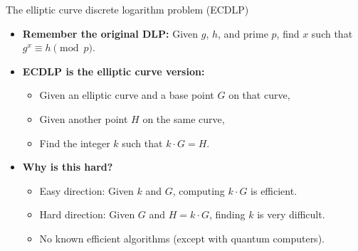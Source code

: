 \documentclass[aspectratio=169, lualatex, handout]{beamer}
\begin{document}
\begin{frame}{The elliptic curve discrete logarithm problem (ECDLP)}
	\begin{itemize}[<+->]
		\item \textbf{Remember the original DLP:} Given $g$, $h$, and prime $p$, find $x$ such that $g^x \equiv h \pmod{p}$.
		\item \textbf{ECDLP is the elliptic curve version:}
		      \begin{itemize}
			      \item Given an elliptic curve and a base point $G$ on that curve,
			      \item Given another point $H$ on the same curve,
			      \item Find the integer $k$ such that $k \cdot G = H$.
		      \end{itemize}
		\item \textbf{Why is this hard?}
		      \begin{itemize}
			      \item Easy direction: Given $k$ and $G$, computing $k \cdot G$ is efficient.
			      \item Hard direction: Given $G$ and $H = k \cdot G$, finding $k$ is very difficult.
			      \item No known efficient algorithms (except with quantum computers).
		      \end{itemize}
	\end{itemize}
\end{frame}
\end{document}
